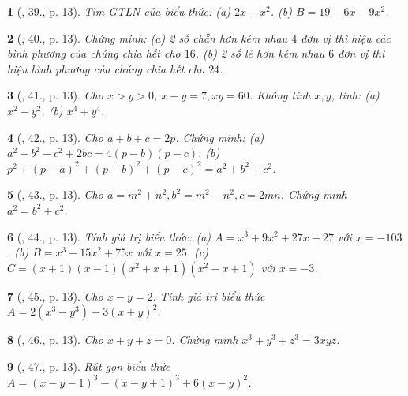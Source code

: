 \documentclass{article}
\newtheorem{baitoan}{}
\begin{document}
\begin{baitoan}[\cite{Tuyen_Toan_8}, 39., p. 13]
	Tìm {\rm GTLN} của biểu thức: (a) $2x - x^2$. (b) $B = 19 - 6x - 9x^2$.
\end{baitoan}

\begin{baitoan}[\cite{Tuyen_Toan_8}, 40., p. 13]
	Chứng minh: (a) 2 số chẵn hơn kém nhau $4$ đơn vị thì hiệu các bình phương của chúng chia hết cho $16$. (b) 2 số lẻ hơn kém nhau $6$ đơn vị thì hiệu bình phương của chúng chia hết cho $24$.
\end{baitoan}

\begin{baitoan}[\cite{Tuyen_Toan_8}, 41., p. 13]
	Cho $x > y > 0$, $x - y = 7,xy = 60$. Không tính $x,y$, tính: (a) $x^2 - y^2$. (b) $x^4 + y^4$.
\end{baitoan}

\begin{baitoan}[\cite{Tuyen_Toan_8}, 42., p. 13]
	Cho $a + b + c = 2p$. Chứng minh: (a) $a^2 - b^2 - c^2 + 2bc = 4(p - b)(p - c)$. (b) $p^2 + (p - a)^2 + (p - b)^2 + (p - c)^2 = a^2 + b^2 + c^2$.
\end{baitoan}

\begin{baitoan}[\cite{Tuyen_Toan_8}, 43., p. 13]
	Cho $a = m^2 + n^2,b^2 = m^2 - n^2,c = 2mn$. Chứng minh $a^2 = b^2 + c^2$.
\end{baitoan}

\begin{baitoan}[\cite{Tuyen_Toan_8}, 44., p. 13]
	Tính giá trị biểu thức: (a) $A = x^3 + 9x^2 + 27x + 27$ với $x = -103$. (b) $B = x^3 - 15x^2 + 75x$ với $x = 25$. (c) $C = (x + 1)(x - 1)(x^2 + x + 1)(x^2 - x + 1)$ với $x = -3$.
\end{baitoan}

\begin{baitoan}[\cite{Tuyen_Toan_8}, 45., p. 13]
	Cho $x - y = 2$. Tính giá trị biểu thức $A = 2(x^3 - y^3) - 3(x + y)^2$.
\end{baitoan}

\begin{baitoan}[\cite{Tuyen_Toan_8}, 46., p. 13]
	Cho $x + y + z = 0$. Chứng minh $x^3 + y^3 + z^3 = 3xyz$.
\end{baitoan}

\begin{baitoan}[\cite{Tuyen_Toan_8}, 47., p. 13]
	Rút gọn biểu thức $A = (x - y - 1)^3 - (x - y + 1)^3 + 6(x - y)^2$.
\end{baitoan}
\end{document}
